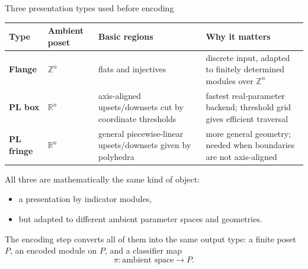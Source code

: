 \documentclass[aspectratio=169,11pt]{beamer}
\begin{document}
\begin{frame}{Three presentation types used before encoding}
	\small
	\renewcommand{\arraystretch}{1.25}
	\begin{tabular}{p{} p{} p{} p{}}
		\hline
		\textbf{Type} & \textbf{Ambient poset} & \textbf{Basic regions} & \textbf{Why it matters} \\
		\hline
		\textbf{Flange} &
		$\mathbb{Z}^n$ &
		flats and injectives &
		discrete input, adapted to finitely determined modules over $\mathbb{Z}^n$ \\
		
		\textbf{PL box} &
		$\mathbb{R}^n$ &
		axis-aligned upsets/downsets cut by coordinate thresholds &
		fastest real-parameter backend; threshold grid gives efficient traversal \\
		
		\textbf{PL fringe} &
		$\mathbb{R}^n$ &
		general piecewise-linear upsets/downsets given by polyhedra &
		more general geometry; needed when boundaries are not axis-aligned \\
		\hline
	\end{tabular}
	
	\vspace{0.2em}
	All three are mathematically the same kind of object:
	\begin{itemize}
		\item a presentation by indicator modules,
		\item but adapted to different ambient parameter spaces and geometries.
	\end{itemize}
	
	\vspace{0.2em}
	The encoding step converts all of them into the same output type:
	a finite poset $P$, an encoded module on $P$, and a classifier map
	\[
	\pi : \text{ambient space} \to P.
	\]
\end{frame}
\end{document}
